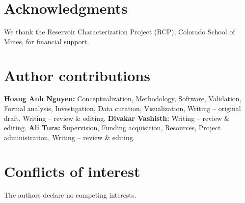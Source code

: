 \documentclass[11pt,a4paper]{article}
\begin{document}
\section*{Acknowledgments}
We thank the Reservoir Characterization Project (RCP), Colorado School of Mines, for financial support.

\section*{Author contributions}
\textbf{Hoang Anh Nguyen:} Conceptualization, Methodology, Software, Validation, Formal analysis, Investigation, Data curation, Visualization, Writing -- original draft, Writing -- review \& editing.
\textbf{Divakar Vashisth:} Writing -- review \& editing.
\textbf{Ali Tura:} Supervision, Funding acquisition, Resources, Project administration, Writing -- review \& editing.

\section*{Conflicts of interest}
The authors declare no competing interests.



\end{document}

